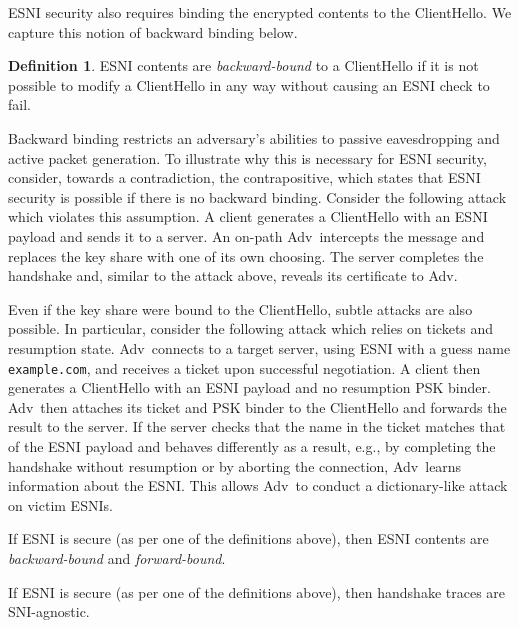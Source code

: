\documentclass{article}
\newcommand{\adv}{{\sf Adv}}
\theoremstyle{definition}
\newtheorem{definition}{Definition}[section]
\begin{document}
ESNI security also requires binding the encrypted contents to the ClientHello. We capture this 
notion of backward binding below.

\begin{definition}
ESNI contents are \emph{backward-bound} to a ClientHello if it is not possible to modify a ClientHello in 
any way without causing an ESNI check to fail.
\end{definition}

Backward binding restricts an adversary's abilities to passive eavesdropping and active packet generation.
To illustrate why this is necessary for ESNI security, consider, towards a contradiction, the contrapositive,
which states that ESNI security is possible if there is no backward binding. Consider the following attack
which violates this assumption. A client generates a ClientHello with an ESNI payload and sends it to a server.
An on-path \adv\ intercepts the message and replaces the key share with one of its own choosing. The server
completes the handshake and, similar to the attack above, reveals its certificate to \adv. 

Even if the key share were bound to the ClientHello, subtle attacks are also possible. In particular, consider
the following attack which relies on tickets and resumption state. \adv\ connects to a target server, using ESNI 
with a guess name {\tt example.com}, and receives a ticket upon successful negotiation. A client then
generates a ClientHello with an ESNI payload and no resumption PSK binder. \adv\ then attaches its ticket and 
PSK binder to the ClientHello and forwards the result to the server. If the server checks that the name in 
the ticket matches that of the ESNI payload and behaves differently as a result, e.g., by completing the handshake
without resumption or by aborting the connection, \adv\ learns information about the ESNI. This allows \adv\ to
conduct a dictionary-like attack on victim ESNIs.

\begin{theorem}
If ESNI is secure (as per one of the definitions above), then ESNI contents are \emph{backward-bound} and \emph{forward-bound}.
\end{theorem}


\begin{theorem}
If ESNI is secure (as per one of the definitions above), then handshake traces are SNI-agnostic.
\end{theorem}
\end{document}
